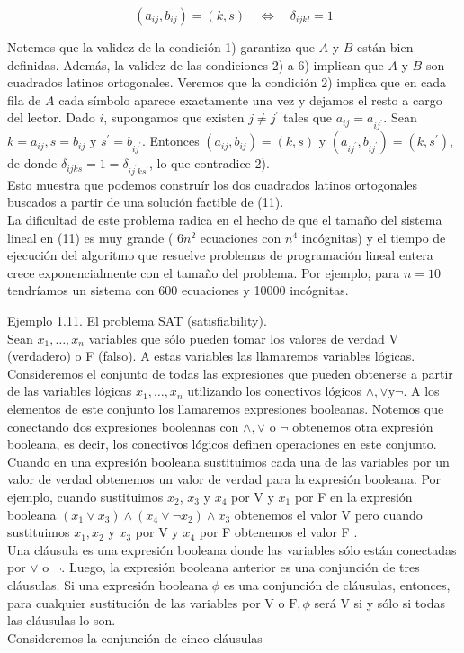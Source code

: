 \documentclass[10pt]{article}
\begin{document}
$$
\left(a_{i j}, b_{i j}\right)=(k, s) \quad \Longleftrightarrow \quad \delta_{i j k l}=1
$$

Notemos que la validez de la condición 1) garantiza que $A$ y $B$ están bien definidas. Además, la validez de las condiciones 2) a 6) implican que $A$ y $B$ son cuadrados latinos ortogonales. Veremos que la condición 2) implica que en cada fila de $A$ cada símbolo aparece exactamente una vez y dejamos el resto a cargo del lector. Dado $i$, supongamos que existen $j \neq j^{\prime}$ tales que $a_{i j}=a_{i j^{\prime}}$. Sean $k=a_{i j}, s=b_{i j}$ y $s^{\prime}=b_{i j^{\prime}}$. Entonces $\left(a_{i j}, b_{i j}\right)=(k, s)$ y $\left(a_{i j^{\prime}}, b_{i j^{\prime}}\right)=\left(k, s^{\prime}\right)$, de donde $\delta_{i j k s}=1=\delta_{i j^{\prime} k s^{\prime}}$, lo que contradice 2).\\
Esto muestra que podemos construír los dos cuadrados latinos ortogonales buscados a partir de una solución factible de (11).\\
La dificultad de este problema radica en el hecho de que el tamaño del sistema lineal en (11) es muy grande ( $6 n^{2}$ ecuaciones con $n^{4}$ incógnitas) y el tiempo de ejecución del algoritmo que resuelve problemas de programación lineal entera crece exponencialmente con el tamaño del problema. Por ejemplo, para $n=10$ tendríamos un sistema con 600 ecuaciones y 10000 incógnitas.

Ejemplo 1.11. El problema SAT (satisfiability).\\
Sean $x_{1}, \ldots, x_{n}$ variables que sólo pueden tomar los valores de verdad V (verdadero) o F (falso). A estas variables las llamaremos variables lógicas. Consideremos el conjunto de todas las expresiones que pueden obtenerse a partir de las variables lógicas $x_{1}, \ldots, x_{n}$ utilizando los conectivos lógicos $\wedge, \vee \mathrm{y} \neg$. A los elementos de este conjunto los llamaremos expresiones booleanas. Notemos que conectando dos expresiones booleanas con $\wedge, \vee$ o $\neg$ obtenemos otra expresión booleana, es decir, los conectivos lógicos definen operaciones en este conjunto.\\
Cuando en una expresión booleana sustituimos cada una de las variables por un valor de verdad obtenemos un valor de verdad para la expresión booleana. Por ejemplo, cuando sustituimos $x_{2}$, $x_{3}$ y $x_{4}$ por V y $x_{1}$ por F en la expresión booleana $\left(x_{1} \vee x_{3}\right) \wedge\left(x_{4} \vee \neg x_{2}\right) \wedge x_{3}$ obtenemos el valor V pero cuando sustituimos $x_{1}, x_{2}$ y $x_{3}$ por V y $x_{4}$ por F obtenemos el valor F .\\
Una cláusula es una expresión booleana donde las variables sólo están conectadas por $\vee$ o $\neg$. Luego, la expresión booleana anterior es una conjunción de tres cláusulas. Si una expresión booleana $\phi$ es una conjunción de cláusulas, entonces, para cualquier sustitución de las variables por V o $\mathrm{F}, \phi$ será V si y sólo si todas las cláusulas lo son.\\
Consideremos la conjunción de cinco cláusulas
\end{document}
